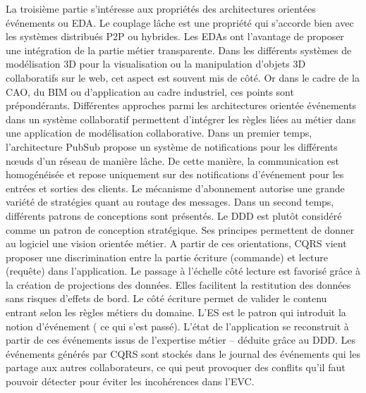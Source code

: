 La troisième partie s'intéresse aux propriétés des architectures orientées 
événements ou \gls{EDA}. Le couplage lâche est une propriété 
qui s'accorde bien avec les systèmes distribués \gls{P2P} ou hybrides. Les 
\glspl{EDA} ont l'avantage de proposer une intégration de la partie métier 
transparente. Dans les différents systèmes de modélisation \gls{3D} pour la 
visualisation ou la manipulation d'objets \gls{3D} collaboratifs sur le web, 
cet aspect est souvent mis de côté. Or dans le cadre de 
la \gls{CAO}, du \gls{BIM} ou d'application au cadre industriel, ces points sont 
prépondérants.
Différentes approches parmi les architectures orientée événements dans un 
système collaboratif permettent d'intégrer les règles liées au métier dans une 
application de modélisation collaborative. Dans un premier temps, l'architecture 
\gls{PubSub} propose un système de notifications pour les différents 
n\oe uds d'un réseau de manière lâche. De cette manière, la communication est 
homogénéisée et repose uniquement sur des notifications d'événement pour les 
entrées et sorties des clients. Le mécanisme d'abonnement autorise une 
grande variété de stratégies quant au routage des messages.
Dans un second temps, différents patrons de conceptions sont présentés. Le 
\gls{DDD} est plutôt considéré comme un patron de conception stratégique. Ses 
principes permettent de donner au logiciel une vision orientée métier. 
A partir de ces orientations, \gls{CQRS} vient proposer une discrimination entre la 
partie écriture (commande) et lecture (requête) dans l'application. Le passage à 
l'échelle côté lecture est favorisé grâce à la création de projections des données. 
Elles facilitent la restitution des données sans risques d'effets de bord. 
Le côté écriture permet de valider le contenu entrant selon les règles métiers 
du domaine. L'\gls{ES} est le patron qui introduit la notion d'événement (\og 
ce qui s'est passé\fg{}). L'état de l'application se reconstruit à 
partir de ces événements issus de l'expertise métier -- déduite grâce au \gls{DDD}. 
Les événements générés par \gls{CQRS} sont stockés dans le journal des 
événements qui les partage aux autres collaborateurs, ce qui peut 
provoquer des conflits qu'il faut pouvoir détecter pour éviter les incohérences dans 
l'\gls{EVC}. 

